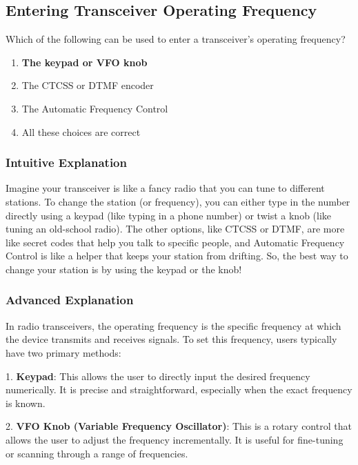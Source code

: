 \subsection{Entering Transceiver Operating Frequency}
\label{T4B02}

\begin{tcolorbox}[colback=gray!10!white,colframe=black!75!black,title=T4B02]
Which of the following can be used to enter a transceiver’s operating frequency?
\begin{enumerate}[label=\Alph*)]
    \item \textbf{The keypad or VFO knob}
    \item The CTCSS or DTMF encoder
    \item The Automatic Frequency Control
    \item All these choices are correct
\end{enumerate}
\end{tcolorbox}

\subsubsection{Intuitive Explanation}
Imagine your transceiver is like a fancy radio that you can tune to different stations. To change the station (or frequency), you can either type in the number directly using a keypad (like typing in a phone number) or twist a knob (like tuning an old-school radio). The other options, like CTCSS or DTMF, are more like secret codes that help you talk to specific people, and Automatic Frequency Control is like a helper that keeps your station from drifting. So, the best way to change your station is by using the keypad or the knob!

\subsubsection{Advanced Explanation}
In radio transceivers, the operating frequency is the specific frequency at which the device transmits and receives signals. To set this frequency, users typically have two primary methods:

1. \textbf{Keypad}: This allows the user to directly input the desired frequency numerically. It is precise and straightforward, especially when the exact frequency is known.

2. \textbf{VFO Knob (Variable Frequency Oscillator)}: This is a rotary control that allows the user to adjust the frequency incrementally. It is useful for fine-tuning or scanning through a range of frequencies.

